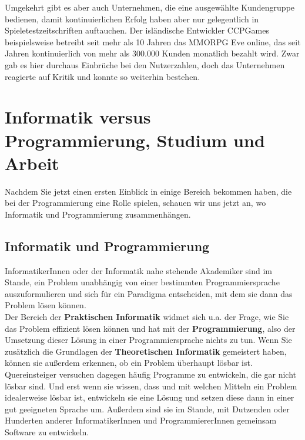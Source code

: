 Umgekehrt gibt es aber auch Unternehmen, die eine ausgewählte Kundengruppe bedienen, damit kontinuierlichen Erfolg haben aber nur gelegentlich in Spieletestzeitschriften auftauchen. Der isländische Entwickler CCPGames beispielsweise betreibt seit mehr als 10 Jahren das MMORPG Eve online, das seit Jahren kontinuierlich von mehr als 300.000 Kunden monatlich bezahlt wird. Zwar gab es hier durchaus Einbrüche bei den Nutzerzahlen, doch das Unternehmen reagierte auf Kritik und konnte so weiterhin bestehen.

\section{Informatik versus Programmierung, Studium und Arbeit}

Nachdem Sie jetzt einen ersten Einblick in einige Bereich bekommen haben, die bei der Programmierung eine Rolle spielen, schauen wir uns jetzt an, wo Informatik und Programmierung zusammenhängen.

\subsection{Informatik und Programmierung}

InformatikerInnen oder der Informatik nahe stehende Akademiker sind im Stande, ein Problem unabhängig von einer bestimmten Programmiersprache auszuformulieren und sich für ein Paradigma entscheiden, mit dem sie dann das Problem lösen können.\\

Der Bereich der \textbf{Praktischen Informatik} widmet sich u.a. der Frage, wie Sie das Problem effizient lösen können und hat mit der \textbf{Programmierung}, also der Umsetzung dieser Lösung in einer Programmiersprache nichts zu tun. Wenn Sie zusätzlich die Grundlagen der \textbf{Theoretischen Informatik} gemeistert haben, können sie außerdem erkennen, ob ein Problem überhaupt lösbar ist. Quereinsteiger versuchen dagegen häufig Programme zu entwickeln, die gar nicht lösbar sind. Und erst wenn sie wissen, dass und mit welchen Mitteln ein Problem idealerweise lösbar ist, entwickeln sie eine Lösung und setzen diese dann in einer gut geeigneten Sprache um. Außerdem sind sie im Stande, mit Dutzenden oder Hunderten anderer InformatikerInnen und ProgrammiererInnen gemeinsam Software zu entwickeln.\\

